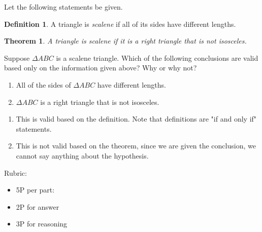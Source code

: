 \documentclass{article}
\newtheorem*{theorem}{Theorem}
\theoremstyle{definition}
\newtheorem*{definition}{Definition}
\begin{document}
\begin{question}
    Let the following statements be given. 
       \begin{definition}
          A triangle is \emph{scalene} if all of its sides have different lengths.
       \end{definition}
       \begin{theorem}
          A triangle is scalene if it is a right triangle that is not isosceles.
       \end{theorem}
    Suppose $\Delta ABC$ is a scalene triangle. 
    Which of the following conclusions are valid based only on the information given above? 
    Why or why not?
    \begin{enumerate}
        \item All of the sides of $\Delta ABC$ have different lengths.
        \item $\Delta ABC$ is a right triangle that is not isosceles.
    \end{enumerate}
\end{question}
\begin{solution}
    \begin{enumerate}
        \item This is valid based on the definition. Note that definitions are "if and only if" statements.
        \item This is not valid based on the theorem, since we are given the conclusion, 
            we cannot say anything about the hypothesis.
    \end{enumerate}
    
{\color{red} Rubric:
\begin{itemize}
\item 5P per part:
\item 2P for answer
\item 3P for reasoning
\end{itemize}}
\end{solution}
\end{document}
